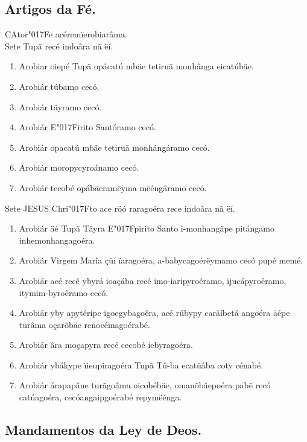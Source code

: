 \documentclass[openany,titlepage,12pt]{book}
\newcommand{\lgS}{\char"017F}
\begin{document}
\subsection{Artigos da Fé.}

\lettrine[findent =4pt, nindent=0pt, lines=2]
{C}{A}tor\lgS e acéremïerobiarâma.\\ Sete Tupã recé indoâra
nã ëí.

\begin{enumerate}
    \item Arobiar oiepé Tupã opácatú mbäe tetiruã monhânga
    eicatúbäe.
    \item Arobiár túbamo cecó.
    \item Arobiár täyramo cecó.
    \item Arobiár E\lgS irito Santóramo cecó.
    \item Arobiár opacatú mbäe tetiruã monhángáramo cecó.
    \item Arobiár moropycyroánamo cecó.
    \item Arobiár tecobé opábäeramëyma mëéngâramo cecó.
\end{enumerate}
\noindent
Sete JESUS Chri\lgS to ace röó raragoéra rece indoâra nã ëí.
\begin{enumerate}
    \item Arobiár äé Tupã Täyra E\lgS pirito Santo
    i-monhangâpe pitángamo inhemonhangagoéra.
    \item Arobiár Virgem Marîa çüí ïaragoéra, 
    a-babycagoérëymamo cecó pupé memé.
    \item Arobiár acé recé ybyrá ioaçába recé imo-iaripyroéramo,
    ïjucápyroêramo, itymim-byroêramo cecó.
    \item Arobiár yby apytéripe igoegybagoêra, acé rúbypy
    caräíbetá angoéra äépe turâma oçarõbäe renocémagoérabé.
    \item Arobiár âra moçapyra recé cecobé iebyragoéra.
    \item Arobiár ybákype ïieupiragoéra Tupã Tû-ba
    ecatüâba coty cénabé.
    \item Arobiár árapapâne turãgoâma oicobébäe,
    omanõbäepoéra pabẽ recó catúagoéra, cecóangaipgoérabé 
    repymëénga.
\end{enumerate}

\subsection{Mandamentos da Ley de Deos.}
\end{document}
